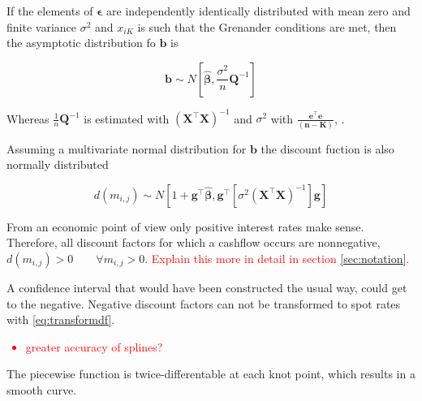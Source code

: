 If the elements of $\bm{\epsilon}$ are independently identically distributed with mean zero and finite variance $\sigma^2$ and $x_{iK}$ is such that the Grenander conditions are met, then the asymptotic distribution fo $\bm{b}$ is


\begin{equation}
  \label{eq:badistrb}
 \bm{b}\sim N\left[\bm{\hat \beta},\frac{\sigma^2}{n}\bm{Q}^{-1}\right]
\end{equation}

Whereas $\frac{1}{n}\bm{Q}^{-1}$ is estimated with $\left(\bm{X}^\top\bm{X}\right)^{-1}$ and $\sigma^2$ with $\bm{\frac{e^\top e}{(n-K)}}$, \citep[see][p. 69]{Greene2002}.

Assuming a multivariate normal distribution for $\bm{b}$ the discount fuction is also normally distributed


\begin{equation}
  \label{eq:ddistr}
  d(m_{i,j}) \sim N\left[1+\bm{g}^\top\bm{\hat\beta},\bm{g}^\top\left[\sigma^2(\bm{X^\top X})^{-1} \right]\bm{g} \right]
\end{equation} 

From an economic point of view only positive interest rates make sense. Therefore, all discount factors for which a cashflow occurs are nonnegative, $d(m_{i,j})>0 \qquad  \forall m_{i,j}> 0$. \textcolor{red}{Explain this more in detail in section \ref{sec:notation}.}


A confidence interval that would have been constructed the usual way, could get to the negative. Negative discount factors can not be transformed to spot rates with \eqref{eq:transformdf}.


\textcolor{red}{
  \begin{itemize}
  \item greater accuracy of splines?
  \end{itemize}
}

The piecewise function is twice-differentable at each knot point, which results in a smooth curve.





